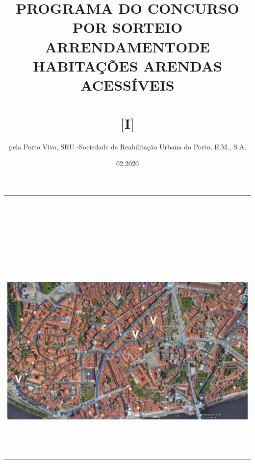 \documentclass[]{report}
\title{PROGRAMA DO CONCURSO POR SORTEIO \\ ARRENDAMENTODE HABITAÇÕES ARENDAS ACESSÍVEIS \\ ~\\ $[$I$]$ \\}
\author{pela Porto Vivo, SRU -Sociedade de Reabilitação Urbana do Porto, E.M., S.A.}
\date{02.2020}
\begin{document}
\maketitle



\begin{table}[]
	\begin{tabular}{c}
		~\\
		~\\
		~\\
		~\\
		~\\
		~\\
		~\\
		\includegraphics[width=1\textwidth]{t0} \\
		~\\
		~\\
		~\\
	\end{tabular}
\end{table}
\end{document}
